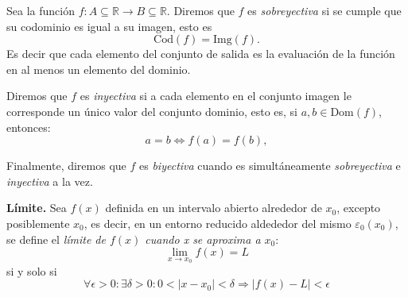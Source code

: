 \begin{definition}
  
  Sea la funci\'on $f: A \subseteq \mathbb{R} \rightarrow B \subseteq \mathbb{R}$. Diremos que
   $f$ es \textit{sobreyectiva} si se cumple que su codominio es igual a su imagen, esto es
   \begin{equation*}
        \text{Cod}(f)=\text{Img}(f).
    \end{equation*}   Es decir que cada elemento del conjunto de salida es la evaluación de la función en al menos un elemento del dominio.

 Diremos que $f$ es   \textit{inyectiva} si a cada elemento en el conjunto imagen le corresponde un único
    valor del  conjunto dominio, esto es,   si  $a,b\in \text{Dom}(f)$, entonces:
     \begin{equation*}
        a=b \iff f(a)=f(b),
    \end{equation*} 

    Finalmente, diremos que $f$  es \textit{biyectiva} cuando es simultáneamente \textit{sobreyectiva} e \textit{inyectiva} a la vez.
\end{definition}

\begin{definition}{\textbf{Límite.}}
    Sea $f(x)$ definida en un intervalo abierto alrededor de $x_0$, excepto posiblemente $x_0$, es decir, en un entorno reducido aldededor del mismo
    $\varepsilon_0(x_0)$, se define el \textit{límite de $f(x)$ cuando x se aproxima a $x_0$}:
    \begin{equation*}
        \lim_{x\to x_0}{f(x)}=L 
    \end{equation*}
    si y solo si
    \begin{equation*}
        \forall \epsilon>0 : \exists \delta >0 : 0<\left\lvert x-x_0 \right\rvert<\delta \Rightarrow \left\lvert f(x) - L\right\rvert < \epsilon 
    \end{equation*}
    \label{def:Limite}
\end{definition}

